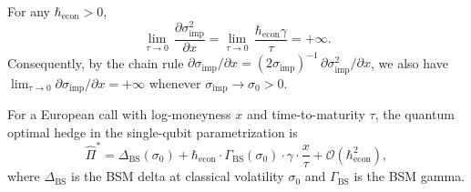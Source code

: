 \begin{corollary}\label{cor:skew-explosion}
For any $\hbar_{\mathrm{econ}} > 0$,
\begin{equation*}
    \lim_{\tau \to 0}\,\frac{\partial \sigma^2_{\mathrm{imp}}}{\partial x}
    = \lim_{\tau \to 0}\,\frac{\hbar_{\mathrm{econ}}\gamma}{\tau}
    = +\infty.
\end{equation*}
Consequently, by the chain rule
$\partial\sigma_{\mathrm{imp}}/\partial x
= (2\sigma_{\mathrm{imp}})^{-1}\,\partial\sigma^2_{\mathrm{imp}}/\partial x$,
we also have
$\lim_{\tau\to 0}\partial\sigma_{\mathrm{imp}}/\partial x = +\infty$
whenever $\sigma_{\mathrm{imp}} \to \sigma_0 > 0$.
\end{corollary}

\begin{proposition}\label{prop:quantum-optimal-hedge}
For a European call with log-moneyness $x$ and time-to-maturity $\tau$, the quantum
optimal hedge in the single-qubit parametrization is
\begin{equation}\label{eq:quantum-optimal-hedge}
    \hat{\Pi}^* = \Delta_{\mathrm{BS}}(\sigma_0)
    + \hbar_{\mathrm{econ}} \cdot \Gamma_{\mathrm{BS}}(\sigma_0) \cdot \gamma
      \cdot \frac{x}{\tau}
    + \mathcal{O}(\hbar_{\mathrm{econ}}^2),
\end{equation}
where $\Delta_{\mathrm{BS}}$ is the BSM delta at classical volatility $\sigma_0$
and $\Gamma_{\mathrm{BS}}$ is the BSM gamma.
\end{proposition}
